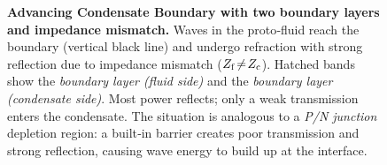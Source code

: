 \documentclass[11pt,a4paper]{article}
\begin{document}
\begin{figure}[t]
\caption{\textbf{Advancing Condensate Boundary with two boundary layers and impedance mismatch.}
Waves in the proto‑fluid reach the boundary (vertical black line) and undergo refraction with strong reflection due to impedance mismatch ($Z_{\rm f}\!\neq\!Z_{\rm c}$). Hatched bands show the \emph{boundary layer (fluid side)} and the \emph{boundary layer (condensate side)}. Most power reflects; only a weak transmission enters the condensate. The situation is analogous to a \emph{P/N junction} depletion region: a built‑in barrier creates poor transmission and strong reflection, causing wave energy to build up at the interface.}
\label{fig:clean-boundary}
\end{figure}
\end{document}
